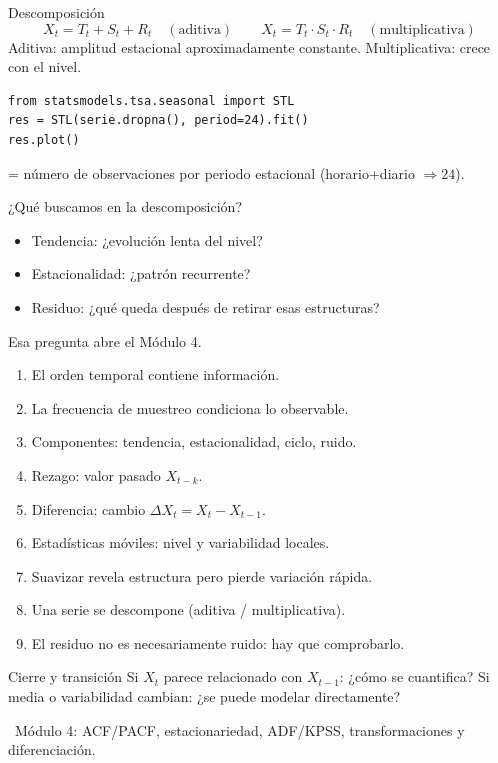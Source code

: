 \begin{frame}[fragile]{Descomposición}
\[
X_t=T_t+S_t+R_t \quad(\text{aditiva})
\qquad
X_t=T_t\cdot S_t\cdot R_t \quad(\text{multiplicativa})
\]
Aditiva: amplitud estacional aproximadamente constante. Multiplicativa: crece con el nivel.
\begin{lstlisting}
from statsmodels.tsa.seasonal import STL
res = STL(serie.dropna(), period=24).fit()
res.plot()
\end{lstlisting}
 = número de observaciones por periodo estacional (horario+diario $\Rightarrow 24$).
\end{frame}

\begin{frame}{¿Qué buscamos en la descomposición?}
\begin{itemize}
  \item Tendencia: ¿evolución lenta del nivel?
  \item Estacionalidad: ¿patrón recurrente?
  \item Residuo: ¿qué queda después de retirar esas estructuras?
\end{itemize}
\vfill
{}
Esa pregunta abre el Módulo 4.
\end{frame}

\begin{frame}
\begin{recordar}
\begin{enumerate}
  \item El orden temporal contiene información.
  \item La frecuencia de muestreo condiciona lo observable.
  \item Componentes: tendencia, estacionalidad, ciclo, ruido.
  \item Rezago: valor pasado $X_{t-k}$.
  \item Diferencia: cambio $\Delta X_t=X_t-X_{t-1}$.
  \item Estadísticas móviles: nivel y variabilidad locales.
  \item Suavizar revela estructura pero pierde variación rápida.
  \item Una serie se descompone (aditiva / multiplicativa).
  \item El residuo no es necesariamente ruido: hay que comprobarlo.
\end{enumerate}
\end{recordar}
\end{frame}

\begin{frame}{Cierre y transición}
\vfill
Si $X_t$ parece relacionado con $X_{t-1}$: ¿cómo se cuantifica?
Si media o variabilidad cambian: ¿se puede modelar directamente?
\vfill
\begin{center}
\fl\ Módulo 4: ACF/PACF, estacionariedad, ADF/KPSS, transformaciones y diferenciación.
\end{center}
\end{frame}



